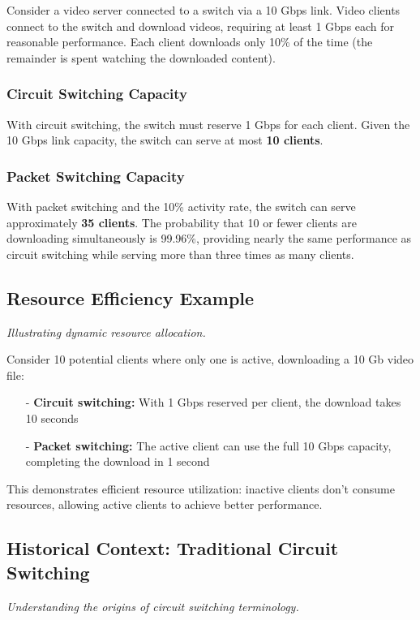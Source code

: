 \documentclass[../../compsys.tex]{subfiles}
\begin{document}
Consider a video server connected to a switch via a 10 Gbps link. Video clients connect to the switch and download videos, requiring at least 1 Gbps each for reasonable performance. Each client downloads only 10\% of the time (the remainder is spent watching the downloaded content).

\subsubsection{Circuit Switching Capacity}
With circuit switching, the switch must reserve 1 Gbps for each client. Given the 10 Gbps link capacity, the switch can serve at most \textbf{10 clients}.

\subsubsection{Packet Switching Capacity}
With packet switching and the 10\% activity rate, the switch can serve approximately \textbf{35 clients}. The probability that 10 or fewer clients are downloading simultaneously is 99.96\%, providing nearly the same performance as circuit switching while serving more than three times as many clients.

\subsection{Resource Efficiency Example}
\textit{Illustrating dynamic resource allocation.}

Consider 10 potential clients where only one is active, downloading a 10 Gb video file:

\begin{itemize}
  \item[-] \textbf{Circuit switching:} With 1 Gbps reserved per client, the download takes 10 seconds
  \item[-] \textbf{Packet switching:} The active client can use the full 10 Gbps capacity, completing the download in 1 second
\end{itemize}

This demonstrates efficient resource utilization: inactive clients don't consume resources, allowing active clients to achieve better performance.

\subsection{Historical Context: Traditional Circuit Switching}
\textit{Understanding the origins of circuit switching terminology.}
\end{document}
